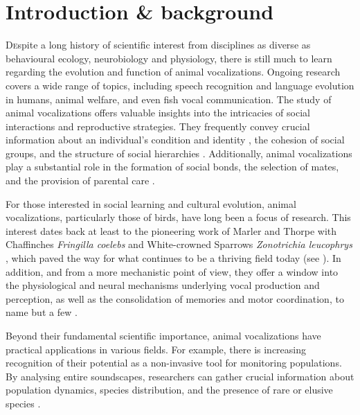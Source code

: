 \section{Introduction \& background}
\lettrine[lines=2]Despite a long history of scientific interest from disciplines as diverse as behavioural ecology, neurobiology and physiology, there is still much to learn regarding the evolution and function of animal vocalizations. Ongoing research covers a wide range of topics, including speech recognition and language evolution in humans, animal welfare, and even fish vocal communication. The study of animal vocalizations offers valuable insights into the intricacies of social interactions and reproductive strategies. They frequently convey crucial information about an individual's condition and identity \parencite{lehmann2017, linhart2019}, the cohesion of social groups, and the structure of social hierarchies \parencite{bell2010, engesser2022, radford2007}. Additionally, animal vocalizations play a substantial role in the formation of social bonds, the selection of mates, and the provision of parental care \parencite{behr2004, gerhardt1991, pitcher2010, roulin2001}.

For those interested in social learning and cultural evolution, animal vocalizations, particularly those of birds, have long been a focus of research. This interest dates back at least to the pioneering work of Marler and Thorpe with Chaffinches \textit{Fringilla coelebs} and White-crowned Sparrows \textit{Zonotrichia leucophrys} \parencite{marler1964, Marler1962, marler1952, thorpe1958}, which paved the way for what continues to be a thriving field today (see \cite{mets2019, riebel2015, williams2021, youngblood2022}). In addition, and from a more mechanistic point of view, they offer a window into the physiological and neural mechanisms underlying vocal production and perception, as well as the consolidation of memories and motor coordination, to name but a few \parencite{davenport2023}. 

Beyond their fundamental scientific importance, animal vocalizations have practical applications in various fields. For example, there is increasing recognition of their potential as a non-invasive tool for monitoring populations. By analysing entire soundscapes, researchers can gather crucial information about population dynamics, species distribution, and the presence of rare or elusive species \parencite{kahl2021, sethi2020, sugai2019}.


